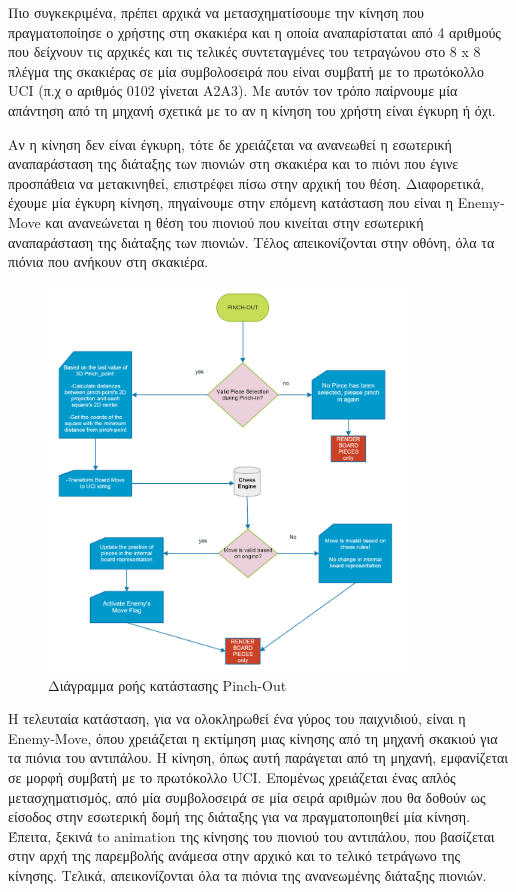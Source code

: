 Πιο συγκεκριμένα, πρέπει αρχικά να μετασχηματίσουμε την κίνηση που πραγματοποίησε ο χρήστης στη σκακιέρα και η οποία αναπαρίσταται από 4 αριθμούς που δείχνουν τις αρχικές και τις τελικές συντεταγμένες του τετραγώνου στο 8 x 8 πλέγμα της σκακιέρας σε μία συμβολοσειρά που είναι συμβατή με το πρωτόκολλο UCI (π.χ ο αριθμός 0102 γίνεται A2A3). Με αυτόν τον τρόπο παίρνουμε μία απάντηση από τη μηχανή σχετικά με το αν η κίνηση του χρήστη είναι έγκυρη ή όχι. 


Αν η κίνηση δεν είναι έγκυρη, τότε δε χρειάζεται να ανανεωθεί η εσωτερική αναπαράσταση της διάταξης των πιονιών στη σκακιέρα και το πιόνι που έγινε προσπάθεια να μετακινηθεί, επιστρέφει πίσω στην αρχική του θέση. Διαφορετικά, έχουμε μία έγκυρη κίνηση, πηγαίνουμε στην επόμενη κατάσταση που είναι η Enemy-Move και ανανεώνεται η θέση του πιονιού που κινείται στην εσωτερική αναπαράσταση της διάταξης των πιονιών. Τέλος απεικονίζονται στην οθόνη, όλα τα πιόνια που ανήκουν στη σκακιέρα.


\begin{figure}[H]
    \centering
    \includegraphics[width=0.85\textwidth]{Files/Figures/pinch_out.pdf}
    \caption[Διάγραμμα ροής κατάστασης Pinch-Out]{Διάγραμμα ροής κατάστασης Pinch-Out}
    \label{fig:pinch_out}
\end{figure}



Η τελευταία κατάσταση, για να ολοκληρωθεί ένα γύρος του παιχνιδιού, είναι η Enemy-Move, όπου χρειάζεται η εκτίμηση μιας κίνησης από τη μηχανή σκακιού για τα πιόνια του αντιπάλου. Η κίνηση, όπως αυτή παράγεται από τη μηχανή, εμφανίζεται σε μορφή συμβατή με το πρωτόκολλο UCI. Επομένως χρειάζεται ένας απλός μετασχηματισμός, από μία συμβολοσειρά σε μία σειρά αριθμών που θα δοθούν ως είσοδος στην εσωτερική δομή της διάταξης για να πραγματοποιηθεί μία κίνηση.
Έπειτα, ξεκινά to animation της κίνησης του πιονιού του αντιπάλου, που βασίζεται στην αρχή της παρεμβολής ανάμεσα στην αρχικό και το τελικό τετράγωνο της κίνησης. Τελικά, απεικονίζονται όλα τα πιόνια της ανανεωμένης διάταξης πιονιών.


